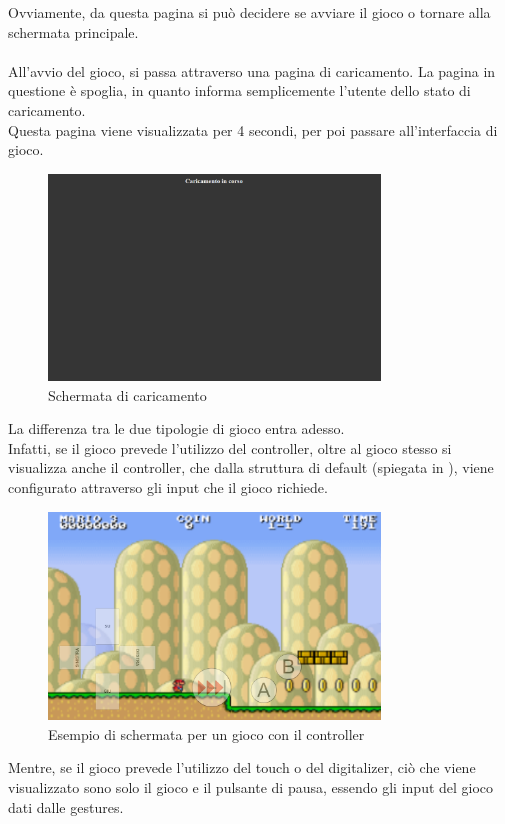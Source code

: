 Ovviamente, da questa pagina si può decidere se avviare il gioco o tornare alla schermata principale.\\\\
All'avvio del gioco, si passa attraverso una pagina di caricamento. La pagina in questione è spoglia, in quanto informa semplicemente l'utente dello stato di caricamento.\\
Questa pagina viene visualizzata per 4 secondi, per poi passare all'interfaccia di gioco.
\begin{figure}[h]
    \centering
    \includegraphics[width=250pt]{images/product/schermataCaricamento.png}
    \caption{Schermata di caricamento}
    \label{fig:schermataCaricamento}
\end{figure}
\newpage
La differenza tra le due tipologie di gioco entra adesso.\\
Infatti, se il gioco prevede l'utilizzo del controller, oltre al gioco stesso si visualizza anche il controller, che dalla struttura di default (spiegata in ), viene configurato attraverso gli input che il gioco richiede.
\begin{figure}[h]
    \centering
    \includegraphics[width=250pt]{images/product/schermataGiocoController.png}
    \caption{Esempio di schermata per un gioco con il controller}
    \label{fig:schermataGiocoController}
\end{figure}
\newpage
Mentre, se il gioco prevede l'utilizzo del touch o del digitalizer, ciò che viene visualizzato sono solo il gioco e il pulsante di pausa, essendo gli input del gioco dati dalle gestures.\\

